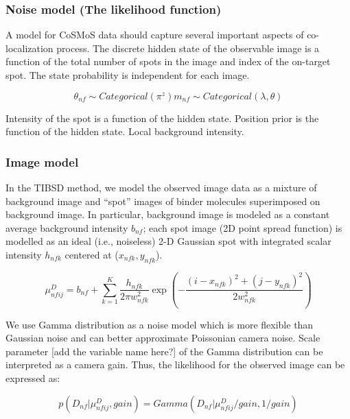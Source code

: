 \subsubsection{Noise model (The likelihood function)}

A model for CoSMoS data should capture several important aspects of co-localization process. The discrete hidden state of the observable image is a function of the total number of spots in the image and index of the on-target spot. The state probability is independent for each image.

\begin{equation*}
    \theta_{nf} \sim Categorical(\pi^z)
    m_{nf} \sim Categorical(\lambda, \theta)
\end{equation*}

Intensity of the spot is a function of the hidden state. Position prior is the function of the hidden state. Local background intensity.

\subsubsection{Image model}

In the TIBSD method, we model the observed image data as a mixture of background image and “spot” images of binder molecules superimposed on background image. In particular, background image is modeled as a constant average background intensity $b_{nf}$; each spot image (2D point spread function) is modelled as an ideal (i.e., noiseless) 2-D Gaussian spot with integrated scalar intensity $h_{nfk}$ centered at ($x_{nfk}, y_{nfk}$).  

\textbf{\begin{equation*}
    \mu^{D}_{nfij} = b_{nf} + \sum_{k=1}^{K} \dfrac{h_{nfk}}{2 \pi w^2_{nfk}} \exp{\left ( -\dfrac{(i-x_{nfk})^2 + (j-y_{nfk})^2}{2w^2_{nfk}} \right)}
\end{equation*}}

We use Gamma distribution as a noise model which is more flexible than Gaussian noise and can better approximate Poissonian camera noise. Scale parameter [add the variable name here?] of the Gamma distribution can be interpreted as a camera gain. Thus, the likelihood for the observed image can be expressed as:
 
 \begin{equation*}
     p(D_{nf}|\mu^D_{nfij},gain) = Gamma(D_{nf}|\mu^D_{nfij}/gain,1/gain)
 \end{equation*}

